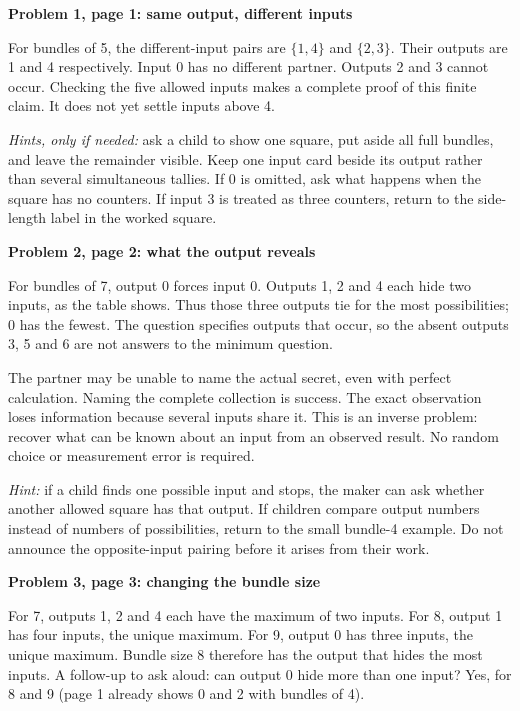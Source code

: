 \documentclass[11pt]{article}
\newcommand{\sub}[1]{\par\textbf{#1}\par}
\begin{document}
\sub{Problem 1, page 1: same output, different inputs}
For bundles of 5, the different-input pairs are $\{1,4\}$ and $\{2,3\}$. Their outputs are 1 and 4 respectively. Input 0 has no different partner. Outputs 2 and 3 cannot occur. Checking the five allowed inputs makes a complete proof of this finite claim. It does not yet settle inputs above 4.

\emph{Hints, only if needed:} ask a child to show one square, put aside all full bundles, and leave the remainder visible. Keep one input card beside its output rather than several simultaneous tallies. If 0 is omitted, ask what happens when the square has no counters. If input 3 is treated as three counters, return to the side-length label in the worked square.

\sub{Problem 2, page 2: what the output reveals}
For bundles of 7, output 0 forces input 0. Outputs 1, 2 and 4 each hide two inputs, as the table shows. Thus those three outputs tie for the most possibilities; 0 has the fewest. The question specifies outputs that occur, so the absent outputs 3, 5 and 6 are not answers to the minimum question.

The partner may be unable to name the actual secret, even with perfect calculation. Naming the complete collection is success. The exact observation loses information because several inputs share it. This is an inverse problem: recover what can be known about an input from an observed result. No random choice or measurement error is required.

\emph{Hint:} if a child finds one possible input and stops, the maker can ask whether another allowed square has that output. If children compare output numbers instead of numbers of possibilities, return to the small bundle-4 example. Do not announce the opposite-input pairing before it arises from their work.

\sub{Problem 3, page 3: changing the bundle size}
For 7, outputs 1, 2 and 4 each have the maximum of two inputs. For 8, output 1 has four inputs, the unique maximum. For 9, output 0 has three inputs, the unique maximum. Bundle size 8 therefore has the output that hides the most inputs. A follow-up to ask aloud: can output 0 hide more than one input? Yes, for 8 and 9 (page 1 already shows 0 and 2 with bundles of 4).
\end{document}
